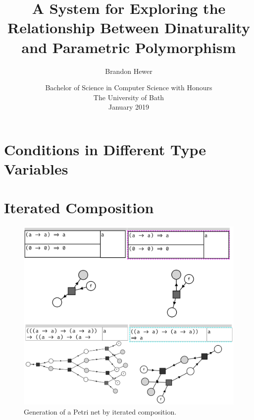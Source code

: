 \documentclass[11pt,openright,hidelinks,a4paper]{article}
\title{A System for Exploring the Relationship Between Dinaturality and Parametric Polymorphism}
\author{Brandon Hewer}
\date{Bachelor of Science in Computer Science with Honours\\The University of Bath\\January 2019}
\begin{document}
\setcounter{page}{0}

\maketitle

\newpage

\tableofcontents
\newpage

\setcounter{page}{1}


\newpage

\newpage

\newpage

\newpage

\newpage

\newpage

\newpage

\newpage


\newpage



\newpage

\appendix

\section{Conditions in Different Type Variables}\label{app:differentvars}

\section{Iterated Composition}\label{app:itcomp}
\begin{figure}[H]
\begin{center}
\includegraphics[scale=0.45]{compose2}
\end{center}
\caption{Generation of a Petri net by iterated composition.}
\label{fig:compose2}
\end{figure}
\end{document}

